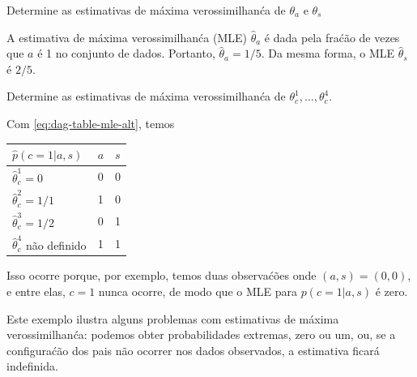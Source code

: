 \begin{exenumerate}
    \item Determine as estimativas de m\'axima verossimilhan\'ca de $\theta_a$ e $\theta_s$
    \begin{solution}
        A estimativa de m\'axima verossimilhan\'ca (MLE) $\hat{\theta}_a$ \'e dada
        pela fra\'c\~ao de vezes que $a$ \'e 1 no conjunto de dados. Portanto,
        $\hat{\theta}_a = 1/5$. Da mesma forma, o MLE $\hat{\theta}_s$ \'e
        $2/5$.
        
    \end{solution}
    
    \item \label{q:cancer-smoking-asbestos-mle-alt-q} Determine as estimativas de m\'axima verossimilhan\'ca de $\theta_c^1, \ldots, \theta_c^4$.
    
    \begin{solution}
        Com \eqref{eq:dag-table-mle-alt}, temos
        \begin{center}
            \begin{tabular}{@{}lll@{}}
                \toprule
                $\hat{p}(c=1 | a,s)$ & $a$ & $s$\\
                \midrule
                $\hat{\theta}^1_c = 0$ & 0 & 0\\
                $\hat{\theta}^2_c = 1/1$ & 1 & 0\\
                $\hat{\theta}^3_c = 1/2$ & 0 & 1\\
                $\hat{\theta}^4_c$ n\~ao definido & 1 & 1\\
                \bottomrule
            \end{tabular}
        \end{center}
        Isso ocorre porque, por exemplo, temos duas observa\'c\~oes onde
        $(a,s)=(0,0)$, e entre elas, $c=1$ nunca ocorre, de modo que o MLE para
        $p(c=1 | a,s)$ \'e zero.
        
        Este exemplo ilustra alguns problemas com estimativas de m\'axima
        verossimilhan\'ca: podemos obter probabilidades extremas, zero ou um, ou, se a
        configura\'c\~ao dos pais n\~ao ocorrer nos dados observados, a estimativa
        ficar\'a indefinida.
        
    \end{solution}
    
\end{exenumerate}



